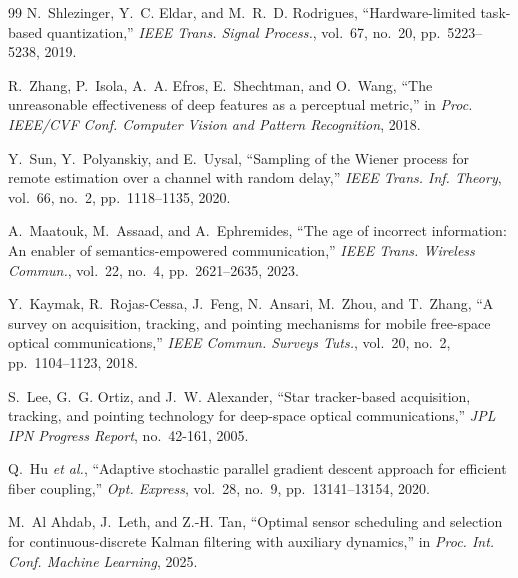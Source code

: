 \documentclass{article}
\theoremstyle{definition}
\theoremstyle{remark}
\begin{document}
\begin{thebibliography}{99}
 N.~Shlezinger, Y.~C. Eldar, and M.~R.~D. Rodrigues,
``Hardware-limited task-based quantization,'' \emph{IEEE Trans. Signal
Process.}, vol.~67, no.~20, pp.~5223--5238, 2019.

 R.~Zhang, P.~Isola, A.~A. Efros, E.~Shechtman, and
O.~Wang, ``The unreasonable effectiveness of deep features as a perceptual
metric,'' in \emph{Proc. IEEE/CVF Conf. Computer Vision and Pattern
Recognition}, 2018.

 Y.~Sun, Y.~Polyanskiy, and E.~Uysal, ``Sampling of the
Wiener process for remote estimation over a channel with random delay,''
\emph{IEEE Trans. Inf. Theory}, vol.~66, no.~2, pp.~1118--1135, 2020.

 A.~Maatouk, M.~Assaad, and A.~Ephremides, ``The age of
incorrect information: An enabler of semantics-empowered communication,''
\emph{IEEE Trans. Wireless Commun.}, vol.~22, no.~4, pp.~2621--2635, 2023.

 Y.~Kaymak, R.~Rojas-Cessa, J.~Feng, N.~Ansari, M.~Zhou,
and T.~Zhang, ``A survey on acquisition, tracking, and pointing mechanisms
for mobile free-space optical communications,'' \emph{IEEE Commun. Surveys
Tuts.}, vol.~20, no.~2, pp.~1104--1123, 2018.

 S.~Lee, G.~G. Ortiz, and J.~W. Alexander, ``Star
tracker-based acquisition, tracking, and pointing technology for deep-space
optical communications,'' \emph{JPL IPN Progress Report}, no.~42-161, 2005.

 Q.~Hu \emph{et al.}, ``Adaptive stochastic parallel
gradient descent approach for efficient fiber coupling,'' \emph{Opt.
Express}, vol.~28, no.~9, pp.~13141--13154, 2020.

 M.~Al Ahdab, J.~Leth, and Z.-H. Tan, ``Optimal sensor
scheduling and selection for continuous-discrete Kalman filtering with
auxiliary dynamics,'' in \emph{Proc. Int. Conf. Machine Learning}, 2025.

\end{thebibliography}
\end{document}
